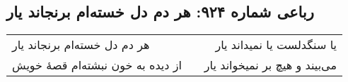 \begin{center}
\section*{رباعی شماره ۹۲۴: هر دم دل خسته‌ام برنجاند یار}
\label{sec:0924}
\begin{longtable}{l p{0.5cm} r}
هر دم دل خسته‌ام برنجاند یار
&&
یا سنگدلست یا نمیداند یار
\\
از دیده به خون نبشته‌ام قصهٔ خویش
&&
می‌بیند و هیچ بر نمیخواند یار
\\
\end{longtable}
\end{center}
